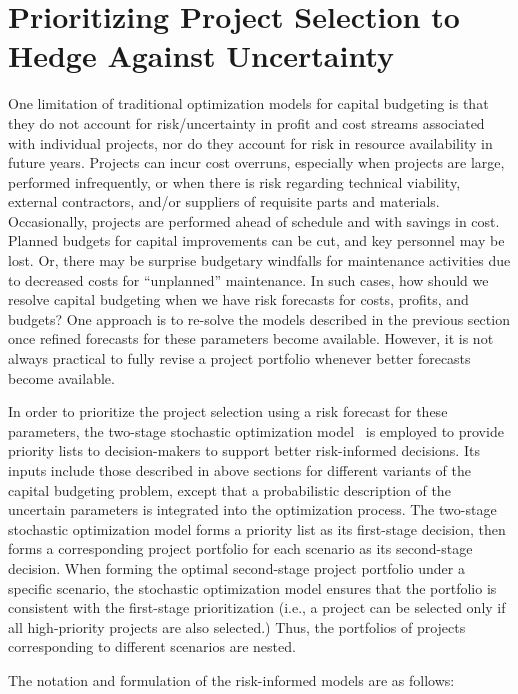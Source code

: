 \section{Prioritizing Project Selection to Hedge Against Uncertainty}
\label{sec:StochasticCapitalBudgeting}

One limitation of traditional optimization models for capital budgeting is that
they do not account for risk/uncertainty in profit and cost streams associated
with individual projects, nor do they account for risk in resource availability
in future years. Projects can incur cost overruns, especially when projects are
large, performed infrequently, or when there is risk regarding technical viability,
external contractors, and/or suppliers of requisite parts and materials.
Occasionally, projects are performed ahead of schedule and with savings in cost.
Planned budgets for capital improvements can be cut, and key personnel may be
lost. Or, there may be surprise budgetary windfalls for maintenance activities
due to decreased costs for “unplanned” maintenance. In such cases, how should
we resolve capital budgeting when we have risk forecasts for costs, profits, and
budgets? One approach is to re-solve the models described in the previous
section once refined forecasts for these parameters become available. However,
it is not always practical to fully revise a project portfolio whenever better
forecasts become available.

In order to prioritize the project selection using a risk forecast for these
parameters, the two-stage stochastic optimization model~\cite{PrioritizingProjectSelection} 
is employed to provide priority lists to decision-makers to support better 
risk-informed decisions.
Its inputs include those described in above sections for different variants of
the capital budgeting problem, except that a probabilistic description of the
uncertain parameters is integrated into the optimization process. The two-stage
stochastic optimization model forms a priority list as its first-stage decision,
then forms a corresponding project portfolio for each scenario as its
second-stage decision. When forming the optimal second-stage project portfolio
under a specific scenario, the stochastic optimization model ensures that the
portfolio is consistent with the first-stage prioritization (i.e., a project can
be selected only if all high-priority projects are also selected.) Thus, the
portfolios of projects corresponding to different scenarios are nested.

The notation and formulation of the risk-informed models are as follows:

